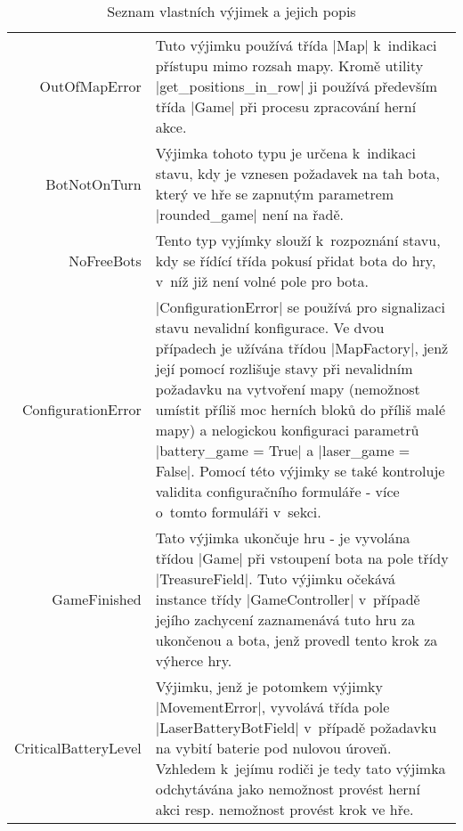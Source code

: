 {
	\renewcommand{\arraystretch}{1.2}
	\centering
	
	\begin{longtable}{ B || p{.6\textwidth} }
        \caption{Seznam vlastních výjimek a jejich popis}\label{table:custom-exceptions}\\

		OutOfMapError & Tuto výjimku používá třída \ic|Map| k~indikaci přístupu mimo rozsah mapy. Kromě utility \ic|get_positions_in_row| ji používá především třída \ic|Game| při procesu zpracování herní akce. \\

		BotNotOnTurn & Výjimka tohoto typu je určena k~indikaci stavu, kdy je vznesen požadavek na tah bota, který ve hře se zapnutým parametrem \ic|rounded_game| není na řadě. \\

		NoFreeBots & Tento typ vyjímky slouží k~rozpoznání stavu, kdy se řídící třída pokusí přidat bota do hry, v~níž již není volné pole pro bota. \\

		ConfigurationError & \ic|ConfigurationError| se používá pro signalizaci stavu nevalidní konfigurace. Ve dvou případech je užívána třídou \ic|MapFactory|, jenž její pomocí rozlišuje stavy při nevalidním požadavku na vytvoření mapy (nemožnost umístit příliš moc herních bloků do příliš malé mapy) a nelogickou konfiguraci parametrů \ic|battery_game = True| a \ic|laser_game = False|. Pomocí této výjimky se také kontroluje validita configuračního formuláře - více o~tomto formuláři v~sekci. \\

		GameFinished & Tato výjimka ukončuje hru - je vyvolána třídou \ic|Game| při vstoupení bota na pole třídy \ic|TreasureField|. Tuto výjimku očekává instance třídy \ic|GameController| v~případě jejího zachycení zaznamenává tuto hru za ukončenou a bota, jenž provedl tento krok za výherce hry. \\

		CriticalBatteryLevel & Výjimku, jenž je potomkem výjimky \ic|MovementError|, vyvolává třída pole \ic|LaserBatteryBotField| v~případě požadavku na vybití baterie pod nulovou úroveň. Vzhledem k~jejímu rodiči je tedy tato výjimka odchytávána jako nemožnost provést herní akci resp. nemožnost provést krok ve hře. \\

	\end{longtable}
}

